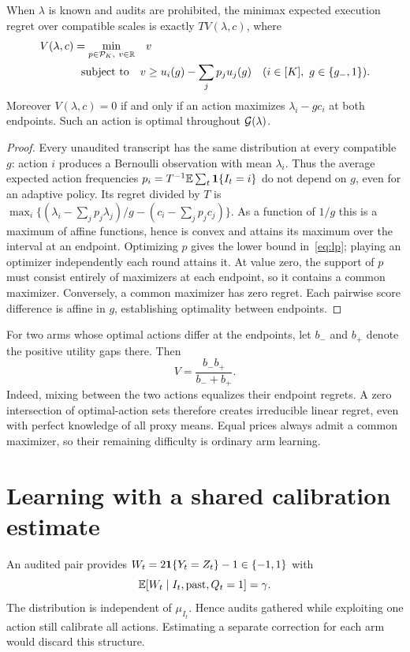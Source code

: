 \begin{theorem}\label{thm:geometry}
When $\lambda$ is known and audits are prohibited, the minimax expected execution regret over compatible scales is exactly $T V(\lambda,c)$, where
\begin{equation}
\begin{split}
 V(\lambda,c)=\min_{p\in\mathcal P_K,\ v\in\mathbb{R}}\quad &v\\
 \text{subject to}\quad
 v&\geq u_i(g)-\sum_jp_ju_j(g)
 \quad(i\in[K],\ g\in\{g_-,1\}).
\end{split}\label{eq:lp}
\end{equation}
Moreover $V(\lambda,c)=0$ if and only if an action maximizes $\lambda_i-gc_i$ at both endpoints. Such an action is optimal throughout $\mathcal{G}(\lambda)$.
\end{theorem}
\begin{proof}
Every unaudited transcript has the same distribution at every compatible $g$: action $i$ produces a Bernoulli observation with mean $\lambda_i$. Thus the average expected action frequencies $p_i=T^{-1}\mathbb{E}\sum_t\mathbf{1}\{I_t=i\}$ do not depend on $g$, even for an adaptive policy. Its regret divided by $T$ is
$\max_i\{(\lambda_i-\sum_jp_j\lambda_j)/g-(c_i-\sum_jp_jc_j)\}$.
As a function of $1/g$ this is a maximum of affine functions, hence is convex and attains its maximum over the interval at an endpoint. Optimizing $p$ gives the lower bound in~\eqref{eq:lp}; playing an optimizer independently each round attains it. At value zero, the support of $p$ must consist entirely of maximizers at each endpoint, so it contains a common maximizer. Conversely, a common maximizer has zero regret. Each pairwise score difference is affine in $g$, establishing optimality between endpoints.
\end{proof}
For two arms whose optimal actions differ at the endpoints, let $b_-$ and $b_+$ denote the positive utility gaps there. Then
\begin{equation}
V=\frac{b_-b_+}{b_-+b_+}.
\label{eq:twoarmvalue}
\end{equation}
Indeed, mixing between the two actions equalizes their endpoint regrets. A zero intersection of optimal-action sets therefore creates irreducible linear regret, even with perfect knowledge of all proxy means. Equal prices always admit a common maximizer, so their remaining difficulty is ordinary arm learning.

\section{Learning with a shared calibration estimate}
An audited pair provides $W_t=2\mathbf{1}\{Y_t=Z_t\}-1\in\{-1,1\}$ with
\begin{equation}
\mathbb{E}[W_t\mid I_t,\text{past},Q_t=1]=\gamma.
\label{eq:agreement}
\end{equation}
The distribution is independent of $\mu_{I_t}$. Hence audits gathered while exploiting one action still calibrate all actions. Estimating a separate correction for each arm would discard this structure.

